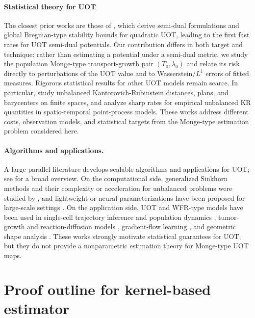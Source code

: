 \documentclass[11pt,reqno]{amsart}
\theoremstyle{definition}
\begin{document}
\paragraph{Statistical theory for UOT}
The closest prior works are those of \cite{vacher2022stability,vacher2023semi}, which derive semi-dual formulations and global Bregman-type stability bounds for quadratic UOT, leading to the first fast rates for UOT semi-dual potentials. Our contribution differs in both target and technique: rather than estimating a potential under a semi-dual metric, we study the population Monge-type transport-growth pair $(T_0,\lambda_0)$ and relate its risk directly to perturbations of the UOT value and to Wasserstein/$L^1$ errors of fitted measures. {Rigorous statistical results for other UOT models remain scarce.} In particular, \cite{HundrieserEtAl2025} study unbalanced Kantorovich-Rubinstein distances, plans, and barycenters on finite spaces, and \cite{struleva2025sharp} analyze sharp rates for empirical unbalanced KR quantities in spatio-temporal point-process models. These works address different costs, observation models, and statistical targets from the Monge-type estimation problem considered here.

\paragraph{Algorithms and applications.}
A large parallel literature develops scalable algorithms and applications for UOT; see \cite{sejourne2023theorynumerics} for a broad overview. On the computational side, generalized Sinkhorn methods and their complexity or acceleration for unbalanced problems were studied by \cite{pham2020sinkhorn,sejourne2022faster}, and lightweight or neural parameterizations have been proposed for large-scale settings \cite{Gazdieva2024,yang2018scalable,choi2024}. On the application side, UOT and WFR-type models have been used in single-cell trajectory inference and population dynamics \cite{schiebinger2019,sha2023cell}, tumor-growth and reaction-diffusion models \cite{dimarino2020}, gradient-flow learning \cite{yan2024}, and geometric shape analysis \cite{bauer2022SRNF}. These works strongly motivate statistical guarantees for UOT, but they do not provide a nonparametric estimation theory for Monge-type UOT maps.

\section{Proof outline for kernel-based estimator} \label{sec:proof_outline_appendix}
\end{document}
